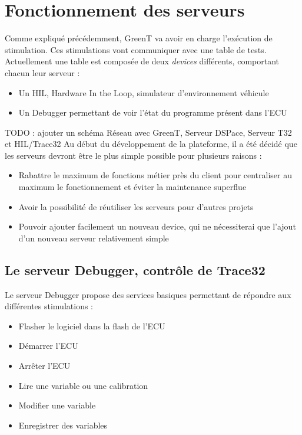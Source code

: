 \section{Fonctionnement des serveurs}
Comme expliqué précédemment, GreenT va avoir en charge l'exécution de stimulation. Ces stimulations vont communiquer avec une table de
tests. Actuellement une table est composée de deux \textit{devices} différents, comportant chacun leur serveur : 
\begin{itemize}
	\item Un HIL, Hardware In the Loop, simulateur d'environnement véhicule
	\item Un Debugger permettant de voir l'état du programme présent dans l'ECU
\end{itemize}

TODO : ajouter un schéma Réseau avec GreenT, Serveur DSPace, Serveur T32 et HIL/Trace32
Au début du développement de la plateforme, il a été décidé que les serveurs devront être le plus simple possible pour plusieurs raisons
: 
\begin{itemize}
	\item Rabattre le maximum de fonctions métier près du client pour centraliser au maximum le fonctionnement et éviter la maintenance superflue
	\item Avoir la possibilité de réutiliser les serveurs pour d'autres projets
	\item Pouvoir ajouter facilement un nouveau device, qui ne nécessiterai que l'ajout d'un nouveau serveur relativement simple
\end{itemize}

\subsection{Le serveur Debugger, contrôle de Trace32}
Le serveur Debugger propose des services basiques permettant de répondre aux différentes stimulations : 
\begin{itemize}
	\item Flasher le logiciel dans la flash de l'ECU
	\item Démarrer l'ECU
	\item Arrêter l'ECU
	\item Lire une variable ou une calibration
	\item Modifier une variable
	\item Enregistrer des variables
\end{itemize}~

